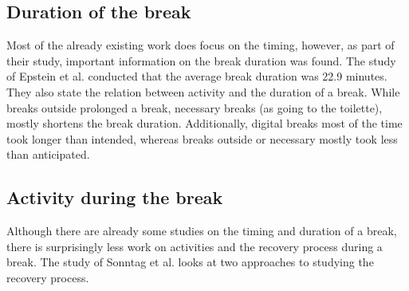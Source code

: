 \documentclass{hasel_thesis}
\begin{document}
\subsection{Duration of the break}

Most of the already existing work does focus on the timing, however, as part of their study, important information on the break duration was found. The study of Epstein et al. \cite{epstein.2016t} conducted that the average break duration was 22.9 minutes. They also state the relation between activity and the duration of a break. While breaks outside prolonged a break, necessary breaks (as going to the toilette), mostly shortens the break duration. Additionally, digital breaks most of the time took longer than intended, whereas breaks outside or necessary mostly took less than anticipated.

\subsection{Activity during the break}

Although there are already some studies on the timing and duration of a break, there is surprisingly less work on activities and the recovery process during a break. The study of Sonntag et al. \cite{Sonnentag.2022} looks at two approaches to studying the recovery process.
\end{document}
